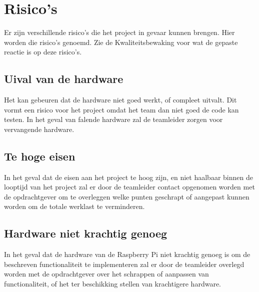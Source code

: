 \chapter{Risico's}
Er zijn verschillende risico's die het project in gevaar kunnen brengen. Hier worden die risico's genoemd.
Zie de Kwaliteitsbewaking voor wat de gepaste reactie is op deze risico's.

\section{Uival van de hardware}
Het kan gebeuren dat de hardware niet goed werkt, of compleet uitvalt. Dit vormt een risico voor het project omdat het team dan niet goed de code kan testen. In het geval van falende hardware zal de teamleider zorgen voor vervangende hardware.

\section{Te hoge eisen}
In het geval dat de eisen aan het project te hoog zijn, en niet haalbaar binnen de looptijd van het project zal er door de teamleider contact opgenomen worden met de opdrachtgever om te overleggen welke punten geschrapt of aangepast kunnen worden om de totale werklast te verminderen.

\section{Hardware niet krachtig genoeg}
In het geval dat de hardware van de Raspberry Pi niet krachtig genoeg is om de beschreven functionaliteit te implementeren zal er door de teamleider overlegd worden met de opdrachtgever over het schrappen of aanpassen van functionaliteit, of het ter beschikking stellen van krachtigere hardware. 